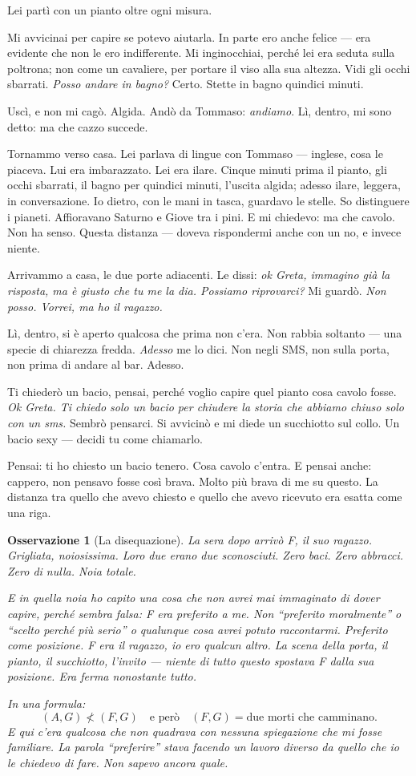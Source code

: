 \documentclass[
    oneside,                 %
    openany,                 %
    titlepage,
    11pt,
    a4paper,
    italian,
    DIV=14,                  %
    headinclude,
    footinclude=true,
    cleardoublepage=empty
]{scrbook}
\theoremstyle{ctplain}
\theoremstyle{ctdef}
\theoremstyle{ctrem}
\newtheorem*{oss}{Osservazione}
\begin{document}
Lei partì con un pianto oltre ogni misura.

Mi avvicinai per capire se potevo aiutarla. In parte ero anche felice --- era evidente che non le ero indifferente. Mi inginocchiai, perché lei era seduta sulla poltrona; non come un cavaliere, per portare il viso alla sua altezza. Vidi gli occhi sbarrati. \emph{Posso andare in bagno?} Certo. Stette in bagno quindici minuti.

Uscì, e non mi cagò. Algida. Andò da Tommaso: \emph{andiamo}. Lì, dentro, mi sono detto: ma che cazzo succede.

Tornammo verso casa. Lei parlava di lingue con Tommaso --- inglese, cosa le piaceva. Lui era imbarazzato. Lei era ilare. Cinque minuti prima il pianto, gli occhi sbarrati, il bagno per quindici minuti, l'uscita algida; adesso ilare, leggera, in conversazione. Io dietro, con le mani in tasca, guardavo le stelle. So distinguere i pianeti. Affioravano Saturno e Giove tra i pini. E mi chiedevo: ma che cavolo. Non ha senso. Questa distanza --- doveva rispondermi anche con un no, e invece niente.

Arrivammo a casa, le due porte adiacenti. Le dissi: \emph{ok Greta, immagino già la risposta, ma è giusto che tu me la dia. Possiamo riprovarci?} Mi guardò. \emph{Non posso. Vorrei, ma ho il ragazzo.}

Lì, dentro, si è aperto qualcosa che prima non c'era. Non rabbia soltanto --- una specie di chiarezza fredda. \emph{Adesso} me lo dici. Non negli SMS, non sulla porta, non prima di andare al bar. Adesso.

Ti chiederò un bacio, pensai, perché voglio capire quel pianto cosa cavolo fosse. \emph{Ok Greta. Ti chiedo solo un bacio per chiudere la storia che abbiamo chiuso solo con un sms.} Sembrò pensarci. Si avvicinò e mi diede un succhiotto sul collo. Un bacio sexy --- decidi tu come chiamarlo.

Pensai: ti ho chiesto un bacio tenero. Cosa cavolo c'entra. E pensai anche: cappero, non pensavo fosse così brava. Molto più brava di me su questo. La distanza tra quello che avevo chiesto e quello che avevo ricevuto era esatta come una riga.

\begin{oss}[La disequazione]
La sera dopo arrivò F, il suo ragazzo. Grigliata, noiosissima. Loro due erano due sconosciuti. Zero baci. Zero abbracci. Zero di nulla. Noia totale.

E in quella noia ho capito una cosa che non avrei mai immaginato di dover capire, perché sembra falsa: F era preferito a me. Non ``preferito moralmente'' o ``scelto perché più serio'' o qualunque cosa avrei potuto raccontarmi. Preferito \emph{come posizione}. F era il ragazzo, io ero qualcun altro. La scena della porta, il pianto, il succhiotto, l'invito --- niente di tutto questo spostava F dalla sua posizione. Era ferma nonostante tutto.

In una formula:
\[
(A,G) \not< (F,G) \quad \text{e però} \quad (F,G) = \text{due morti che camminano.}
\]
E qui c'era qualcosa che non quadrava con nessuna spiegazione che mi fosse familiare. La parola ``preferire'' stava facendo un lavoro diverso da quello che io le chiedevo di fare. Non sapevo ancora quale.
\end{oss}
\end{document}
